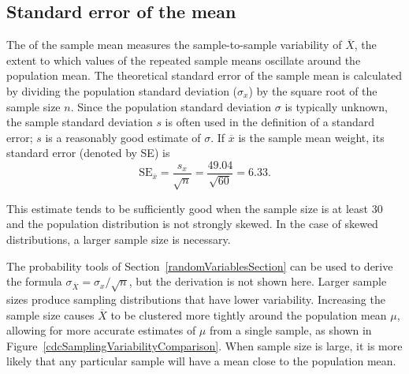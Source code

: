 \subsection{Standard error of the mean}
\label{seOfTheMean}

The  of the sample mean measures the sample-to-sample variability of $\overline{X}$, the extent to which values of the repeated sample means oscillate around the population mean. The theoretical standard error of the sample mean is calculated by dividing the population standard deviation ($\sigma_{x}$) by the square root of the sample size $n$. Since the population standard deviation $\sigma$ is typically unknown, the sample standard deviation $s$ is often used in the definition of a standard error; $s$ is a reasonably good estimate of $\sigma$. If $\overline{x}$ is the sample mean weight, its standard error (denoted by SE) is
\[\text{SE}_{\overline{x}} = \dfrac{s_{x}}{\sqrt{n}} = \dfrac{49.04}{\sqrt{60}} = 6.33. \]

This estimate tends to be sufficiently good when the sample size is at least 30 and the population distribution is not strongly skewed. In the case of skewed distributions, a larger sample size is necessary.

The probability tools of Section~\ref{randomVariablesSection} can be used to derive the formula $\sigma_{\overline{X}} = \sigma_x/\sqrt{n}$, but the derivation is not shown here. Larger sample sizes produce sampling distributions that have lower variability. Increasing the sample size causes $\overline{X}$ to be clustered more tightly around the population mean $\mu$, allowing for more accurate estimates of $\mu$ from a single sample, as shown in Figure~\ref{cdcSamplingVariabilityComparison}. When sample size is large, it is more likely that any particular sample will have a mean close to the population mean. 

